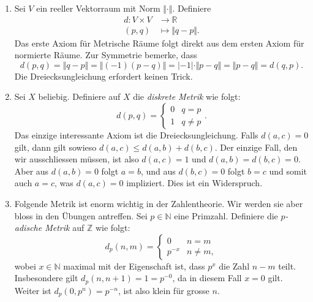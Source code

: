 \documentclass[../main.tex]{subfiles}
\begin{document}
\begin{examples}
  \leavevmode
  \begin{enumerate}[(1)]
    \item Sei $V$ ein reeller Vektorraum mit Norm $\Vert \cdot \Vert$.
      Definiere
      \begin{align*}
        d \colon V \times V & \to \mathbb{R} \\
        (p, q) & \mapsto \Vert q - p \Vert.
      \end{align*}
      Das erste Axiom für Metrische Räume folgt direkt aus dem
      ersten Axiom für normierte Räume.
      Zur Symmetrie bemerke, dass
      \[
        d(p, q) = \Vert q - p  \Vert = \Vert (-1)(p - q) \Vert
        = |-1| \cdot \Vert p - q \Vert = \Vert p - q \Vert
        = d(q, p).
      \]
      Die Dreiecksungleichung erfordert keinen Trick.
    \item Sei $X$ beliebig. Definiere auf $X$ 
      die \emph{diskrete Metrik} wie folgt:
      \[
        d (p, q)
        =
        \begin{cases}
          0 & q = p \\
          1 & q \neq p
        \end{cases}.
      \]
      Das einzige interessante Axiom ist die Dreiecksungleichung.
      Falls $d(a, c) = 0$ gilt, dann gilt sowieso
      $d(a, c) \leq d(a, b) + d(b, c)$.
      Der einzige Fall, den wir ausschliessen müssen, ist also
      $d(a, c) = 1$ und $d(a, b) = d(b, c) = 0$.
      Aber aus $d(a, b) = 0$ folgt $a = b$, und
      aus $d(b, c) = 0$ folgt $b = c$ und somit
      auch $a = c$, was $d(a, c) = 0$ impliziert. Dies ist ein
      Widerspruch.
    \item Folgende Metrik ist enorm wichtig in der Zahlentheorie.
      Wir werden sie aber bloss in den Übungen antreffen.
      Sei $p \in \mathbb{N}$ eine Primzahl.
      Definiere die \emph{$p$-adische Metrik} auf $\mathbb{Z}$ 
      wie folgt:
      \[
        d_p(n, m) =
        \begin{cases}
          0 & n = m \\
          p^{-x} & n \neq m,
        \end{cases}
      \]
      wobei $x \in \mathbb{N}$ maximal mit der Eigenschaft
      ist, dass
      $p^x$ die Zahl $n -m $ teilt.
      Insbesondere gilt $d_p(n, n + 1) = 1 = p^{-0}$,
      da in diesem Fall $x = 0$ gilt.
      Weiter ist $d_p(0, p^n) = p^{-n}$, ist also klein für
      grosse $n$.
  \end{enumerate}
\end{examples}
\end{document}
